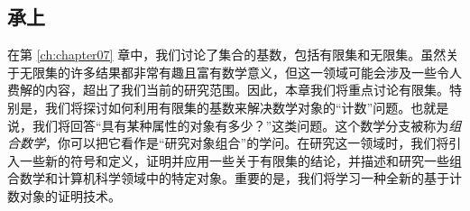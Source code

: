 
\subsection{承上}

在第 \ref{ch:chapter07} 章中，我们讨论了集合的基数，包括有限集和无限集。虽然关于无限集的许多结果都非常有趣且富有数学意义，但这一领域可能会涉及一些令人费解的内容，超出了我们当前的研究范围。因此，本章我们将重点讨论有限集。特别是，我们将探讨如何利用有限集的基数来解决数学对象的``计数''问题。也就是说，我们将回答``具有某种属性的对象有多少？''这类问题。这个数学分支被称为\emph{组合数学}，你可以把它看作是``研究对象组合''的学问。在研究这一领域时，我们将引入一些新的符号和定义，证明并应用一些关于有限集的结论，并描述和研究一些组合数学和计算机科学领域中的特定对象。重要的是，我们将学习一种全新的基于计数对象的证明技术。